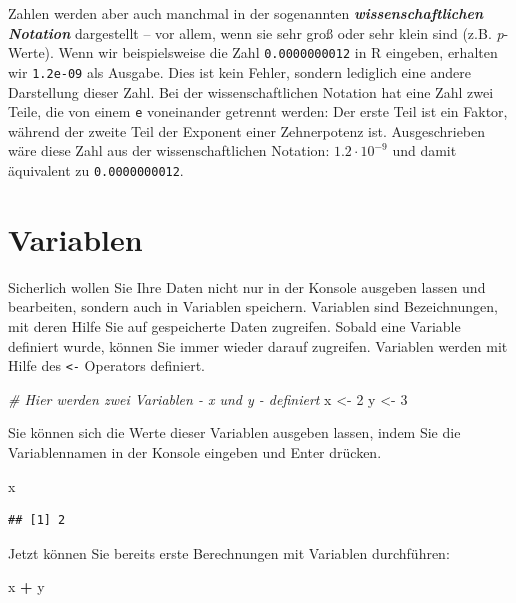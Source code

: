 \documentclass[
  ngerman,
]{book}
\newenvironment{Shaded}{\begin{snugshade}}{\end{snugshade}}
\newcommand{\CommentTok}[1]{\textcolor[rgb]{0.56,0.35,0.01}{\textit{#1}}}
\newcommand{\DecValTok}[1]{\textcolor[rgb]{0.00,0.00,0.81}{#1}}
\newcommand{\NormalTok}[1]{#1}
\newcommand{\OtherTok}[1]{\textcolor[rgb]{0.56,0.35,0.01}{#1}}
\newcommand{\SpecialCharTok}[1]{\textcolor[rgb]{0.81,0.36,0.00}{\textbf{#1}}}
\begin{document}
Zahlen werden aber auch manchmal in der sogenannten \textbf{\emph{wissenschaftlichen Notation}} dargestellt -- vor allem, wenn sie sehr groß oder sehr klein sind (z.B. \emph{p}-Werte). Wenn wir beispielsweise die Zahl \texttt{0.0000000012} in R eingeben, erhalten wir \texttt{1.2e-09} als Ausgabe. Dies ist kein Fehler, sondern lediglich eine andere Darstellung dieser Zahl. Bei der wissenschaftlichen Notation hat eine Zahl zwei Teile, die von einem \texttt{e} voneinander getrennt werden: Der erste Teil ist ein Faktor, während der zweite Teil der Exponent einer Zehnerpotenz ist. Ausgeschrieben wäre diese Zahl aus der wissenschaftlichen Notation: \(1.2\cdot 10^{-9}\) und damit äquivalent zu \texttt{0.0000000012}.

\section{Variablen}\label{variablen}

Sicherlich wollen Sie Ihre Daten nicht nur in der Konsole ausgeben lassen und bearbeiten, sondern auch in Variablen speichern. Variablen sind Bezeichnungen, mit deren Hilfe Sie auf gespeicherte Daten zugreifen. Sobald eine Variable definiert wurde, können Sie immer wieder darauf zugreifen. Variablen werden mit Hilfe des \texttt{\textless{}-} Operators definiert.

\begin{Shaded}
\begin{Highlighting}[]
\CommentTok{\# Hier werden zwei Variablen {-} x und y {-} definiert}
\NormalTok{x }\OtherTok{\textless{}{-}} \DecValTok{2}
\NormalTok{y }\OtherTok{\textless{}{-}} \DecValTok{3}
\end{Highlighting}
\end{Shaded}

Sie können sich die Werte dieser Variablen ausgeben lassen, indem Sie die Variablennamen in der Konsole eingeben und Enter drücken.

\begin{Shaded}
\begin{Highlighting}[]
\NormalTok{x}
\end{Highlighting}
\end{Shaded}

\begin{verbatim}
## [1] 2
\end{verbatim}

Jetzt können Sie bereits erste Berechnungen mit Variablen durchführen:

\begin{Shaded}
\begin{Highlighting}[]
\NormalTok{x }\SpecialCharTok{+}\NormalTok{ y}
\end{Highlighting}
\end{Shaded}
\end{document}
